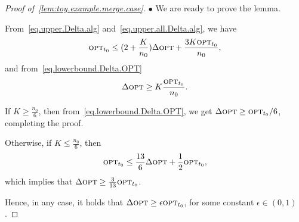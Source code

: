 \begin{proof}[Proof of~\cref{lem:toy.example.merge.case}]
    $ \bullet $ We are ready to prove the lemma.

    From~\eqref{eq.upper.Delta.alg} and~\eqref{eq.upper.all.Delta.alg}, we have
    \begin{align}
        \textsc{opt}_{t_0} \leq (2+\dfrac{K}{n_0})\Delta\textsc{opt} + \dfrac{3K\textsc{opt}_{t_0}}{n_0}, \nonumber
    \end{align}
    and from~\eqref{eq.lowerbound.Delta.OPT}
    \begin{align}
        \Delta\textsc{opt} \geq K \dfrac{\textsc{opt}_{t_0}}{n_0}.\nonumber
    \end{align}

    If $ K\ge \frac{n_0}{6} $, then from~\eqref{eq.lowerbound.Delta.OPT}, we get $ \Delta \textsc{opt}\geq \textsc{opt}_{t_0}/6 $, completing the proof.

    Otherwise, if $ K\le \frac{n_0}{6} $, then
    \begin{align}
        \textsc{opt}_{t_0} \leq \dfrac{13}{6}\Delta \textsc{opt} + \dfrac{1}{2}\textsc{opt}_{t_0},\nonumber
    \end{align}
    which implies that $ \Delta\textsc{opt} \ge \frac{3}{13}\textsc{opt}_{t_0} $.

    Hence, in any case, it holds that $ \Delta \textsc{opt} \ge \epsilon\textsc{opt}_{t_0} $, for some constant $ \epsilon\in (0,1) $.
\end{proof}

